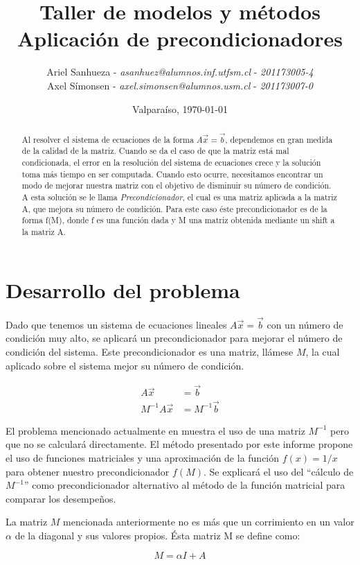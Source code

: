 \documentclass[fleqn]{article}
\title{\textbf{Taller de modelos y métodos}\\Aplicación de precondicionadores}
\author{Ariel Sanhueza - \textit{asanhuez@alumnos.inf.utfsm.cl} - \textit{201173005-4}\\
{Axel Símonsen - \textit{axel.simonsen@alumnos.usm.cl} - \textit{201173007-0}}}
\date{\vspace*{1cm} Valparaíso, \today}
\begin{document}
\maketitle

\begin{abstract}
Al resolver el sistema de ecuaciones de la forma $A\vec{x}=\vec{b}$, dependemos en gran medida de la calidad de la matriz. Cuando se da el caso de que la matriz está mal condicionada, el error en la resolución del sistema de ecuaciones crece y la solución toma más tiempo en ser computada. Cuando esto ocurre, necesitamos encontrar un modo de mejorar nuestra matriz con el objetivo de disminuir su número de condición. A esta solución se le llama \emph{Precondicionador}, el cual es una matriz aplicada a la matriz A, que mejora su número de condición. Para este caso éste precondicionador es de la forma f(M), donde f es una función dada y M una matriz obtenida mediante un shift a la matriz A.
\end{abstract}

\section{Desarrollo del problema}

Dado que tenemos un sistema de ecuaciones lineales $A\vec{x}=\vec{b}$ con un número de condición muy alto, se aplicará un precondicionador para mejorar el número de condición del sistema. Este precondicionador es una matriz, llámese $M$, la cual aplicado sobre el sistema mejor su número de condición.

\begin{align*}
    A\vec{x} &= \vec{b} \\
    M^{-1}A\vec{x} &= M^{-1}\vec{b}
\end{align*}

El problema mencionado actualmente en \cite{1} muestra el uso de una matriz $M^{-1}$ pero que no se calculará directamente. El método presentado por este informe propone el uso de funciones matriciales y una aproximación de la función $f(x) = 1/x$ para obtener nuestro precondicionador $f(M)$. Se explicará el uso del ``cálculo de $M^{-1}$'' como precondicionador alternativo al método de la función matricial para comparar los desempeños.

La matriz $M$ mencionada anteriormente no es más que un corrimiento en un valor $\alpha$ de la diagonal y sus valores propios. Ésta matriz M se define como:


\begin{equation}
 M= \alpha I + A 
\end{equation}
\end{document}
